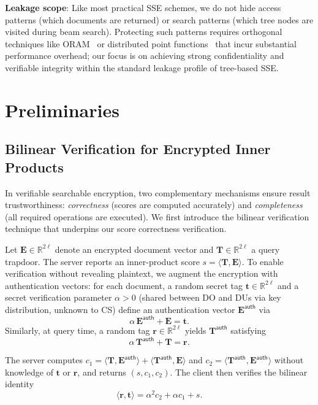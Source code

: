 \documentclass[journal]{IEEEtran}
\begin{document}
\textbf{Leakage scope}: Like most practical SSE schemes, we do not hide access patterns (which documents are returned) or search patterns (which tree nodes are visited during beam search). Protecting such patterns requires orthogonal techniques like ORAM~\cite{stefanov2018path} or distributed point functions~\cite{gilboa2014distributed} that incur substantial performance overhead; our focus is on achieving strong confidentiality and verifiable integrity within the standard leakage profile of tree-based SSE.

\section{Preliminaries}

\subsection{Bilinear Verification for Encrypted Inner Products}

In verifiable searchable encryption, two complementary mechanisms ensure result trustworthiness: \emph{correctness} (scores are computed accurately) and \emph{completeness} (all required operations are executed). We first introduce the bilinear verification technique that underpins our score correctness verification.

Let $\mathbf{E}\in\mathbb{R}^{2\ell}$ denote an encrypted document vector and $\mathbf{T}\in\mathbb{R}^{2\ell}$ a query trapdoor. The server reports an inner-product score $s=\langle \mathbf{T}, \mathbf{E}\rangle$. To enable verification without revealing plaintext, we augment the encryption with authentication vectors: for each document, a random secret tag $\mathbf{t}\in\mathbb{R}^{2\ell}$ and a secret verification parameter $\alpha>0$ (shared between DO and DUs via key distribution, unknown to CS) define an authentication vector $\mathbf{E}^{\mathsf{auth}}$ via
\begin{equation}
\alpha\,\mathbf{E}^{\mathsf{auth}} + \mathbf{E} = \mathbf{t}.
\end{equation}
Similarly, at query time, a random tag $\mathbf{r}\in\mathbb{R}^{2\ell}$ yields $\mathbf{T}^{\mathsf{auth}}$ satisfying
\begin{equation}
\alpha\,\mathbf{T}^{\mathsf{auth}} + \mathbf{T} = \mathbf{r}.
\end{equation}

The server computes $c_1=\langle \mathbf{T}, \mathbf{E}^{\mathsf{auth}}\rangle + \langle \mathbf{T}^{\mathsf{auth}}, \mathbf{E}\rangle$ and $c_2=\langle \mathbf{T}^{\mathsf{auth}}, \mathbf{E}^{\mathsf{auth}}\rangle$ without knowledge of $\mathbf{t}$ or $\mathbf{r}$, and returns $(s, c_1, c_2)$. The client then verifies the bilinear identity
\begin{equation}
\langle \mathbf{r}, \mathbf{t}\rangle = \alpha^2 c_2 + \alpha c_1 + s.
\end{equation}
\end{document}
